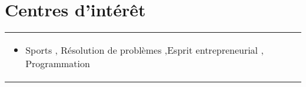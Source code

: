 \documentclass[a4paper,8pt]{article}
\begin{document}
\section{Centres d'intérêt}
\begin{tabularx}{\linewidth}{ @{}l r@{} }
\begin{minipage}[t]{\linewidth}
    \begin{itemize}[nosep,after=\strut, leftmargin=2em, itemsep=2pt]
        \item Sports , Résolution de problèmes ,Esprit entrepreneurial , Programmation 
    \end{itemize}
\end{minipage}
\end{tabularx}
\end{document}
